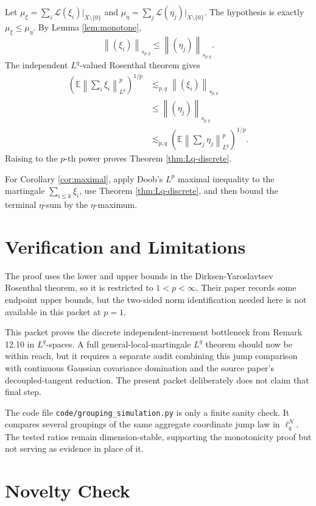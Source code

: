 \documentclass[11pt]{article}
\newcommand{\E}{\mathbb E}
\newcommand{\norm}[1]{\left\lVert #1\right\rVert}
\begin{document}
Let \(\mu_\xi=\sum_i\mathcal L(\xi_i)|_{X\setminus\{0\}}\) and
\(\mu_\eta=\sum_j\mathcal L(\eta_j)|_{X\setminus\{0\}}\).  The hypothesis is
exactly \(\mu_\xi\leq\mu_\eta\).  By Lemma \ref{lem:monotone},
\[
   \norm{(\xi_i)}_{s_{p,q}}
   \leq
   \norm{(\eta_j)}_{s_{p,q}} .
\]
The independent \(L^q\)-valued Rosenthal theorem gives
\[
\begin{aligned}
  \left(\E\norm{\sum_i\xi_i}_{L^q}^p\right)^{1/p}
  &\lesssim_{p,q}
  \norm{(\xi_i)}_{s_{p,q}} \\
  &\leq
  \norm{(\eta_j)}_{s_{p,q}} \\
  &\lesssim_{p,q}
  \left(\E\norm{\sum_j\eta_j}_{L^q}^p\right)^{1/p}.
\end{aligned}
\]
Raising to the \(p\)-th power proves Theorem \ref{thm:Lq-discrete}.

For Corollary \ref{cor:maximal}, apply Doob's \(L^p\) maximal inequality to
the martingale \(\sum_{i\leq k}\xi_i\), use Theorem \ref{thm:Lq-discrete}, and
then bound the terminal \(\eta\)-sum by the \(\eta\)-maximum.

\section*{Verification and Limitations}

The proof uses the lower and upper bounds in the Dirksen-Yaroslavtsev
Rosenthal theorem, so it is restricted to \(1<p<\infty\).  Their paper records
some endpoint upper bounds, but the two-sided norm identification needed here
is not available in this packet at \(p=1\).

This packet proves the discrete independent-increment bottleneck from Remark
12.10 in \(L^q\)-spaces.  A full general-local-martingale \(L^q\) theorem
should now be within reach, but it requires a separate audit combining this
jump comparison with continuous Gaussian covariance domination and the source
paper's decoupled-tangent reduction.  The present packet deliberately does not
claim that final step.

The code file \texttt{code/grouping\_simulation.py} is only a finite sanity
check.  It compares several groupings of the same aggregate coordinate jump
law in \(\ell_q^N\).  The tested ratios remain dimension-stable, supporting
the monotonicity proof but not serving as evidence in place of it.

\section*{Novelty Check}
\end{document}
